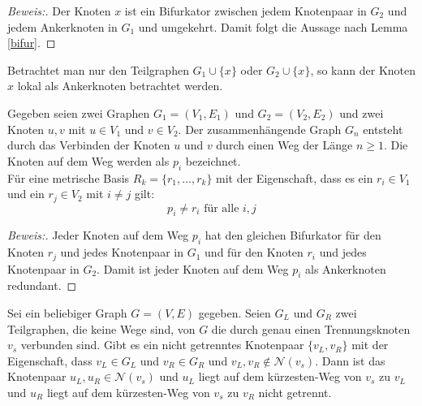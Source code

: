\begin{proof}[Beweis:]
Der Knoten $x$ ist ein Bifurkator zwischen jedem Knotenpaar in $G_2$ und jedem Ankerknoten in $G_1$ und umgekehrt. Damit folgt die Aussage nach Lemma \ref{bifur}.
\end{proof}
Betrachtet man nur den Teilgraphen $G_1 \cup \{x\}$ oder $G_2 \cup \{x\}$, so kann der Knoten $x$ lokal als Ankerknoten betrachtet werden. 
\begin{lem}
\label{keinknotenvonwegindermd}
Gegeben seien zwei Graphen $G_1=(V_1,E_1)$ und $G_2=(V_2,E_2)$ und zwei Knoten $u,v$ mit $u \in V_1$ und $v \in V_2$.
Der zusammenhängende Graph $G_n$ entsteht durch das Verbinden der Knoten $u$ und $v$ durch einen Weg der Länge $n \geq 1$. Die Knoten auf dem Weg werden als $p_i$ bezeichnet.\\
Für eine metrische Basis $R_k= \{ r_1, \ldots , r_k \}$ mit der Eigenschaft, dass es ein $r_i \in V_1$ und ein $r_j \in V_2$  mit $i \neq j$ gilt:
\[p_i \neq r_i \text{ für alle } i,j\]
\end{lem}
\begin{proof}[Beweis:]
Jeder Knoten auf dem Weg $p_i$ hat den gleichen Bifurkator für den Knoten $r_j$ und jedes Knotenpaar in $G_1$ und für den Knoten $r_i$ und jedes Knotenpaar in $G_2$. Damit ist jeder Knoten auf dem Weg $p_i$ als Ankerknoten redundant.
\end{proof}
\begin{lem}
\label{nachbartrennungsknoten}
Sei ein beliebiger Graph $G=(V,E)$ gegeben. Seien $G_L$ und $G_R$ zwei Teilgraphen, die keine Wege sind, von $G$ die durch genau einen Trennungsknoten $v_s$ verbunden sind. Gibt es ein nicht getrenntes Knotenpaar $\{v_L,v_R\}$ mit der Eigenschaft, dass $v_L\in G_L$ und $v_R \in G_R$ und $v_L, v_R \notin \mathcal{N}(v_s)$.\newline
Dann ist das Knotenpaar $u_L,u_R \in \mathcal{N}(v_s)$ und $u_L$ liegt auf dem kürzesten-Weg von $v_s$ zu $v_L$ und $u_R$ liegt auf dem kürzesten-Weg von $v_s$ zu $v_R$ nicht getrennt.
\end{lem}
